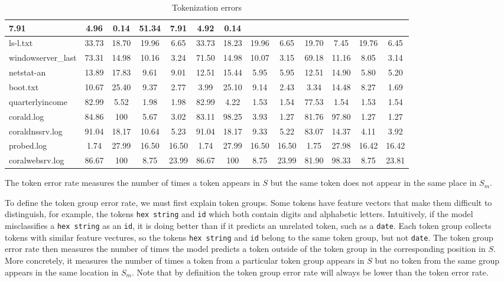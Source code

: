 \begin{table}[th]
\begin{center}
\begin{tabular}{|l||c|c|c|c||c|c|c|c||c|c|c|c|}
7.91
                     & 4.96  & 0.14  & 51.34 & 7.91     & 4.92  & 0.14  \\ \hline
ls-l.txt                   & 33.73 & 18.70 & 19.96 & 6.65  & 33.73 &
               18.23 & 19.96 & 6.65  & 19.70 & 7.45  & 19.76 & 6.45  \\ \hline
windowserver\_last     & 73.31 & 14.98 & 10.16 & 3.24  & 71.50 &
               14.98 & 10.07 & 3.15  & 69.18 & 11.16 & 8.05  & 3.14  \\ \hline
netstat-an                 & 13.89 & 17.83 & 9.61  & 9.01  & 12.51 &
               15.44 & 5.95  & 5.95  & 12.51 & 14.90 & 5.80  & 5.20  \\ \hline
boot.txt                   & 10.67 & 25.40 & 9.37  & 2.77  & 3.99 &
               25.10 & 9.14  & 2.43  & 3.34  & 14.48 & 8.27  & 1.69  \\ \hline
quarterlyincome    & 82.99 & 5.52  & 1.98  & 1.98     & 82.99 &
               4.22  & 1.53  & 1.54     & 77.53 & 1.54  & 1.53  & 1.54     \\ \hline
corald.log            & 84.86 & 100   & 5.67  & 3.02     & 83.11 &
               98.25 & 3.93  & 1.27     & 81.76 & 97.80 & 1.27  & 1.27     \\ \hline
coraldnssrv.log       & 91.04 & 18.17 & 10.64 & 5.23  & 91.04 &
               18.17 & 9.33  & 5.22  & 83.07 & 14.37 & 4.11  & 3.92  \\ \hline
probed.log            & 1.74  & 27.99 & 16.50 & 16.50 & 1.74  &
               27.99 & 16.50 & 16.50 & 1.75  & 27.98 & 16.42 & 16.42 \\ \hline
coralwebsrv.log       & 86.67 & 100   & 8.75  & 23.99 & 86.67 &
               100   & 8.75  & 23.99     & 81.90 & 98.33 & 8.75  & 23.81     \\
               \hline
\end{tabular}
\caption{Tokenization errors}
\label{tab:error}
\end{center}
\end{table}
The token error rate measures the number of times a token appears in
$S$ but the same token does not appear in the same place in $S_m$.

To define the token group error rate, we must first explain token
groups.  Some tokens have feature vectors that make them difficult to
distinguish, for example, the tokens {\tt hex string} and {\tt id}
which both contain digits and alphabetic letters.  Intuitively, if the
model misclassifies a {\tt hex string} as an {\tt id}, it is doing
better than if it predicts an unrelated token, such as a {\tt date}.
Each token group collects tokens with similar feature vectures, so the
tokens {\tt hex string} and {\tt id} belong to the same token group,
but not {\tt date}.  The token group error rate then measures the
number of times the model predicts a token outside of the token group
in the corresponding position in $S$.  More concretely, it measures the number of times a
token from a particular token group appears in $S$ but no token from
the same group appears in the same location in $S_m$.  Note that by
definition the token group error rate will always be lower than the
token error rate.

